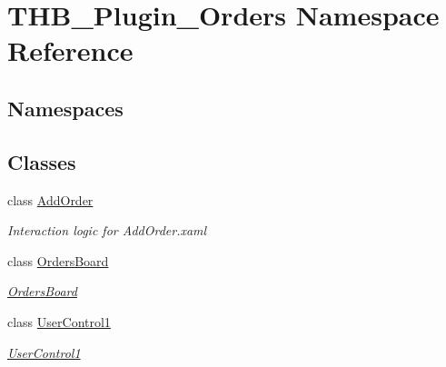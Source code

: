 \hypertarget{namespace_t_h_b___plugin___orders}{}\section{T\+H\+B\+\_\+\+Plugin\+\_\+\+Orders Namespace Reference}
\label{namespace_t_h_b___plugin___orders}
\subsection*{Namespaces}
\begin{DoxyCompactItemize}
\end{DoxyCompactItemize}
\subsection*{Classes}
\begin{DoxyCompactItemize}
\item 
class \mbox{\hyperlink{class_t_h_b___plugin___orders_1_1_add_order}{Add\+Order}}
\begin{DoxyCompactList}\small\item\em Interaction logic for Add\+Order.\+xaml \end{DoxyCompactList}\item 
class \mbox{\hyperlink{class_t_h_b___plugin___orders_1_1_orders_board}{Orders\+Board}}
\begin{DoxyCompactList}\small\item\em \mbox{\hyperlink{class_t_h_b___plugin___orders_1_1_orders_board}{Orders\+Board}} \end{DoxyCompactList}\item 
class \mbox{\hyperlink{class_t_h_b___plugin___orders_1_1_user_control1}{User\+Control1}}
\begin{DoxyCompactList}\small\item\em \mbox{\hyperlink{class_t_h_b___plugin___orders_1_1_user_control1}{User\+Control1}} \end{DoxyCompactList}\end{DoxyCompactItemize}
